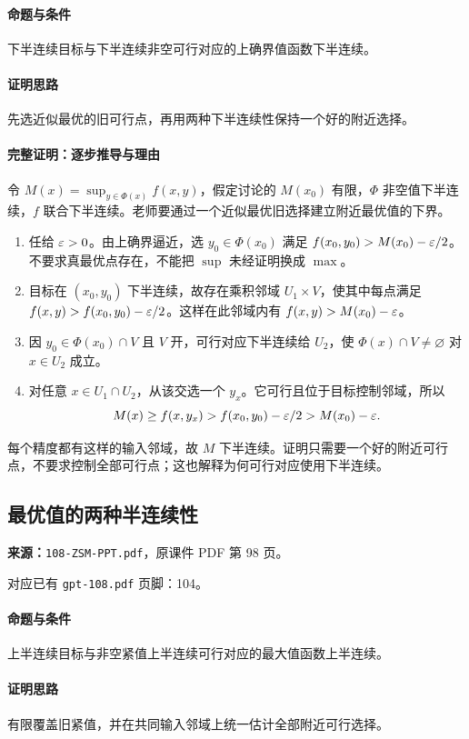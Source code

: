 \paragraph{命题与条件}下半连续目标与下半连续非空可行对应的上确界值函数下半连续。
\paragraph{证明思路}先选近似最优的旧可行点，再用两种下半连续性保持一个好的附近选择。
\paragraph{完整证明：逐步推导与理由}

令 $M(x)=\sup_{y\in\Phi(x)} f(x,y)$，假定讨论的 $M(x_0)$ 有限，$\Phi$ 非空值下半连续，$f$ 联合下半连续。老师要通过一个近似最优旧选择建立附近最优值的下界。
\begin{enumerate}
\item 任给 $\varepsilon>0$。由上确界逼近，选 $y_0\in\Phi(x_0)$ 满足 $f(x_0,y_0)>M(x_0)-\varepsilon/2$。不要求真最优点存在，不能把 $\sup$ 未经证明换成 $\max$。
\item 目标在 $(x_0,y_0)$ 下半连续，故存在乘积邻域 $U_1\times V$，使其中每点满足 $f(x,y)>f(x_0,y_0)-\varepsilon/2$。这样在此邻域内有 $f(x,y)>M(x_0)-\varepsilon$。
\item 因 $y_0\in\Phi(x_0)\cap V$ 且 $V$ 开，可行对应下半连续给 $U_2$，使 $\Phi(x)\cap V\ne\varnothing$ 对 $x\in U_2$ 成立。
\item 对任意 $x\in U_1\cap U_2$，从该交选一个 $y_x$。它可行且位于目标控制邻域，所以
\[M(x)\ge f(x,y_x)>f(x_0,y_0)-\varepsilon/2>M(x_0)-\varepsilon.\]
\end{enumerate}
每个精度都有这样的输入邻域，故 $M$ 下半连续。证明只需要一个好的附近可行点，不要求控制全部可行点；这也解释为何可行对应使用下半连续。

\clearpage\subsection{最优值的两种半连续性}
\textbf{来源：}\texttt{108-ZSM-PPT.pdf}，原课件 PDF 第 98 页。\par
对应已有 \texttt{gpt-108.pdf} 页脚：104。\par
\paragraph{命题与条件}上半连续目标与非空紧值上半连续可行对应的最大值函数上半连续。
\paragraph{证明思路}有限覆盖旧紧值，并在共同输入邻域上统一估计全部附近可行选择。
